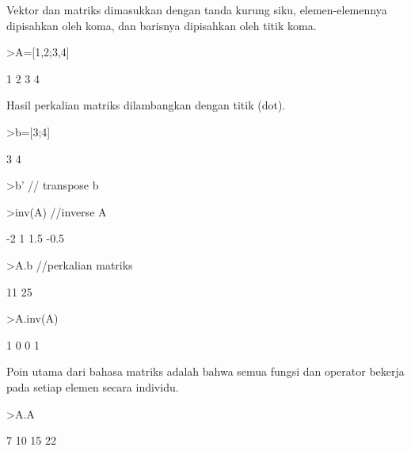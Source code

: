 \documentclass[a4paper,10pt]{article}
\begin{document}
\begin{eulernotebook}
\begin{eulercomment}
\begin{eulercomment}
\begin{eulercomment}
Vektor dan matriks dimasukkan dengan tanda kurung siku,
elemen-elemennya dipisahkan oleh koma, dan barisnya dipisahkan oleh
titik koma.
\end{eulercomment}
\begin{eulerprompt}
>A=[1,2;3,4]
\end{eulerprompt}
\begin{euleroutput}
              1             2 
              3             4 
\end{euleroutput}
\begin{eulercomment}
Hasil perkalian matriks dilambangkan dengan titik (dot).
\end{eulercomment}
\begin{eulerprompt}
>b=[3;4]
\end{eulerprompt}
\begin{euleroutput}
              3 
              4 
\end{euleroutput}
\begin{eulerprompt}
>b' // transpose b
\end{eulerprompt}
\begin{euleroutput}
  [3,  4]
\end{euleroutput}
\begin{eulerprompt}
>inv(A) //inverse A
\end{eulerprompt}
\begin{euleroutput}
             -2             1 
            1.5          -0.5 
\end{euleroutput}
\begin{eulerprompt}
>A.b //perkalian matriks
\end{eulerprompt}
\begin{euleroutput}
             11 
             25 
\end{euleroutput}
\begin{eulerprompt}
>A.inv(A)
\end{eulerprompt}
\begin{euleroutput}
              1             0 
              0             1 
\end{euleroutput}
\begin{eulercomment}
Poin utama dari bahasa matriks adalah bahwa semua fungsi dan operator
bekerja pada setiap elemen secara individu.
\end{eulercomment}
\begin{eulerprompt}
>A.A
\end{eulerprompt}
\begin{euleroutput}
              7            10 
             15            22 

\end{euleroutput}
\end{eulercomment}
\end{eulercomment}
\end{eulernotebook}
\end{document}
